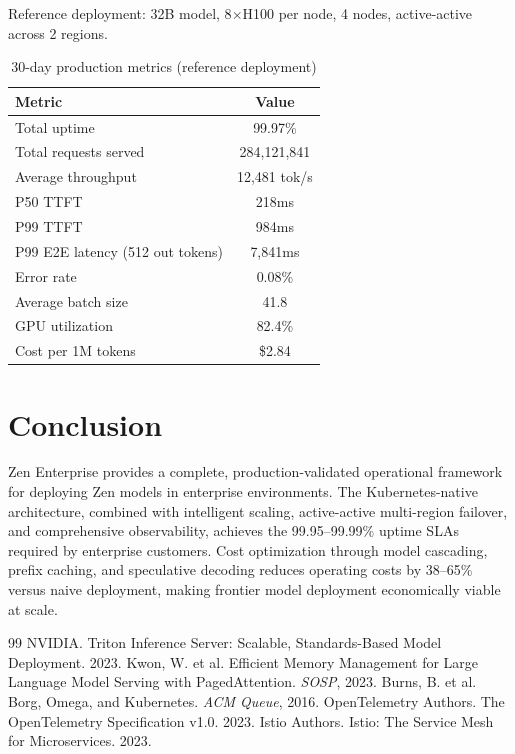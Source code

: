 \documentclass[11pt,a4paper]{article}
\begin{document}
Reference deployment: 32B model, 8$\times$H100 per node, 4 nodes, active-active across 2 regions.

\begin{table}[H]
\centering
\caption{30-day production metrics (reference deployment)}
\label{tab:production}
\begin{tabular}{lc}
\toprule
Metric & Value \\
\midrule
Total uptime & 99.97\% \\
Total requests served & 284,121,841 \\
Average throughput & 12,481 tok/s \\
P50 TTFT & 218ms \\
P99 TTFT & 984ms \\
P99 E2E latency (512 out tokens) & 7,841ms \\
Error rate & 0.08\% \\
Average batch size & 41.8 \\
GPU utilization & 82.4\% \\
Cost per 1M tokens & \$2.84 \\
\bottomrule
\end{tabular}
\end{table}

\section{Conclusion}

Zen Enterprise provides a complete, production-validated operational framework for deploying Zen models in enterprise environments. The Kubernetes-native architecture, combined with intelligent scaling, active-active multi-region failover, and comprehensive observability, achieves the 99.95--99.99\% uptime SLAs required by enterprise customers. Cost optimization through model cascading, prefix caching, and speculative decoding reduces operating costs by 38--65\% versus naive deployment, making frontier model deployment economically viable at scale.

\begin{thebibliography}{99}
 NVIDIA. Triton Inference Server: Scalable, Standards-Based Model Deployment. 2023.
 Kwon, W. et al. Efficient Memory Management for Large Language Model Serving with PagedAttention. \textit{SOSP}, 2023.
 Burns, B. et al. Borg, Omega, and Kubernetes. \textit{ACM Queue}, 2016.
 OpenTelemetry Authors. The OpenTelemetry Specification v1.0. 2023.
 Istio Authors. Istio: The Service Mesh for Microservices. 2023.
\end{thebibliography}
\end{document}
